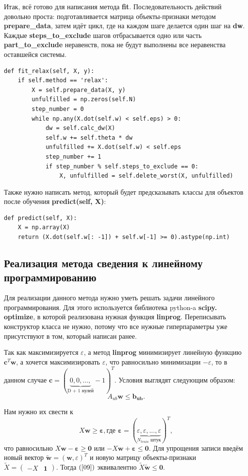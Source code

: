 \documentclass[a4paper]{article}
\newcommand{\w}{\bm{w}}
\newcommand{\veps}{\bm{\varepsilon}}
\begin{document}
Итак, всё готово для написания метода \textbf{fit}. Последовательность действий довольно проста: подготавливается матрица объекты-признаки методом \textbf{prepare\_data}, затем идёт цикл, где на каждом шаге делается один шаг на \textbf{dw}. Каждые \textbf{steps\_to\_exclude} шагов отбрасывается одно или часть \textbf{part\_to\_exclude} неравенств, пока не будут выполнены все неравенства оставшейся системы.
\begin{lstlisting}
def fit_relax(self, X, y):
	if self.method == 'relax':
		X = self.prepare_data(X, y)
		unfulfilled = np.zeros(self.N)
		step_number = 0
		while np.any(X.dot(self.w) < self.eps) > 0:
			dw = self.calc_dw(X)
			self.w += self.theta * dw
			unfulfilled += X.dot(self.w) < self.eps
			step_number += 1
			if step_number % self.steps_to_exclude == 0:
				X, unfulfilled = self.delete_worst(X, unfulfilled)
\end{lstlisting}

Также нужно написать метод, который будет предсказывать классы для объектов после обучения \textbf{predict(self, X)}:
\begin{lstlisting}
def predict(self, X):
	X = np.array(X)
	return (X.dot(self.w[: -1]) + self.w[-1] >= 0).astype(np.int)
\end{lstlisting}


\subsection{Реализация метода сведения к линейному программированию}

Для реализации данного метода нужно уметь решать задачи линейного программирования. Для этого используется библиотека python-a \textbf{scipy. optimize}, в которой реализована нужная функция \textbf{linprog}. Переписывать конструктор класса не нужно, потому что все нужные гиперпараметры уже присутствуют в том, который написан ранее.

Так как максимизируется $\varepsilon$, а метод \textbf{linprog} минимизирует линейную функцию $\bm{c}^T\w$, а хочется максимизировать $\varepsilon$, что равносильно минимизации $- \varepsilon$, то в данном случае $\bm{c} = (\underbrace{0, 0, ...,}_\text{D + 1 нулей}-1)^T$. Условия выглядят следующим образом:
\begin{equation}\label{08}
A_{ub}\w \le \bm{b_{ub}} .
\end{equation}

Нам нужно их свести к 
\begin{equation}\label{09}
X\w \ge \veps , \text{где } \veps = (\underbrace{\varepsilon, \varepsilon, ..., \varepsilon}_\text{$N_{train}$ штук})^T,
\end{equation}
что равносильно $X\w - \veps \ge \bm{0}$ или $-X\w + \veps \le \bm{0}$. Для упрощения записи введём новый вектор $\tilde{\w} = (\w, \varepsilon)^T$ и новую матрицу объекты-признаки
$\tilde{X} = \left(\begin{array}{c|c}
- X &  \bm{1}
\end{array}\right)$. Тогда $(\ref{09})$ эквивалентно $\tilde{X}\tilde{\w} \le \bm{0}$.
\end{document}

